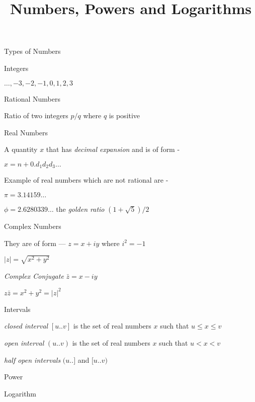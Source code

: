 \documentclass{slides}
\title{Numbers, Powers and Logarithms}
\begin{document}
\maketitle
\begin{slide}
  \begin{center}
    Types of Numbers
  \end{center}  
    Integers

    $ \ldots , -3 , -2, -1, 0, 1, 2, 3 $
    
    Rational Numbers
    
    \normalsize Ratio of two integers $p/q$ where $q$ is positive 

    Real Numbers

    A quantity $x$ that has {\it decimal expansion} and is of form -

    $ x = n + 0.d_{1}d_{2}d_{3}\ldots $

    Example of real numbers which are not rational are -

    $\pi = 3.14159\ldots $
    
    $\phi = 2.6280339\ldots $ the {\it golden ratio } $ (1+\sqrt{5})/2$

    Complex Numbers
    
    They are of form --- $z = x + iy$ where $ i^2 = -1 $

    $ \left|z\right| = \sqrt{x^2 + y^2}$

    {\it Complex Conjugate} $ \bar{z} = x - iy $

    $z\bar{z} = x^2 + y^2 = \left|z\right|^2  $

    Intervals

    {\it closed interval} $ [u..v] $ is the set of real numbers $x$ such that $ u \le x \le v$

    {\it open interval} $ (u..v) $ is the set of real numbers $x$ such that $ u <  x < v$

    {\it half open intervals} $(u..]$ and $[u..v)$

\end{slide}

\begin{slide}
  \begin{center}
    Power
  \end{center}
\end{slide}

\begin{slide}
  \begin{center}
    Logarithm
  \end{center}
\end{slide}
\end{document}
